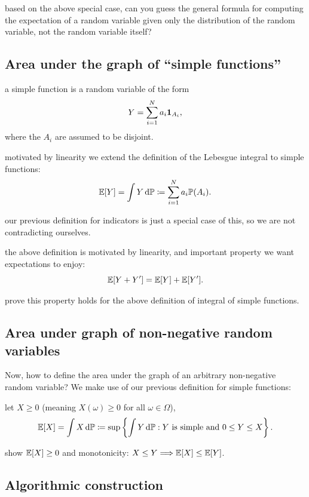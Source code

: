 \documentclass{article}
\begin{document}
 based on the above special case, can you guess the general formula for computing the expectation of a random variable given only the distribution of the random variable, not the random variable itself?


\subsection{Area under the graph of ``simple functions''}\label{sec:area-simple-function}

 a simple function is a random variable of the form
\[ Y = \sum_{i = 1}^N a_i {\mathbf 1}_{A_i}, \]
where the $A_i$ are assumed to be disjoint.

 motivated by linearity we extend the definition of the Lebesgue integral to simple functions:
\[ {\mathbb E}[Y] = \int Y \,\mathrm{d} {\mathbb P} \coloneqq \sum_{i=1}^N a_i {\mathbb P}(A_i). \]

 our previous definition for indicators is just a special case of this, so we are not contradicting ourselves.

 the above definition is motivated by linearity, and important property we want expectations to enjoy:
\[ {\mathbb E}[Y + Y'] = {\mathbb E}[Y] + {\mathbb E}[Y']. \]

 prove this property holds for the above definition of integral of simple functions.


\subsection{Area under graph of non-negative random variables}\label{sec:area-non-neg}

Now, how to define the area under the graph of an arbitrary non-negative random variable? We make use of our previous definition for simple functions:

 let $X \ge 0$ (meaning $X(\omega) \ge 0$ for all $\omega \in \Omega$), 
\[ {\mathbb E}[X] = \int X \,\mathrm{d} {\mathbb P} \coloneqq \sup\left\{ \int Y \,\mathrm{d} {\mathbb P} : Y\text{ is simple and } 0 \le Y \le X\right\}. \] 

 show ${\mathbb E}[X] \ge 0$ and monotonicity: $X \le Y \Longrightarrow {\mathbb E}[X] \le {\mathbb E}[Y]$. 


\subsection{Algorithmic construction}
\end{document}
